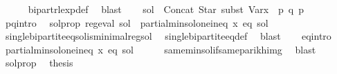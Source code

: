 \begin{isabellebody}
\ \ \ \ \isamarkupfalse%
\ bipart{\isacharunderscore}{\kern0pt}rlexp{\isacharunderscore}{\kern0pt}def\ \isamarkupfalse%
\ blast\isanewline
\isanewline
\ \ \isamarkupfalse%
\ {\isacharquery}{\kern0pt}sol\ {\isacharequal}{\kern0pt}\ {\isachardoublequoteopen}Concat\ {\isacharparenleft}{\kern0pt}Star\ {\isacharparenleft}{\kern0pt}subst\ {\isacharparenleft}{\kern0pt}Var{\isacharparenleft}{\kern0pt}x\ {\isacharcolon}{\kern0pt}{\isacharequal}{\kern0pt}\ p{\isacharparenright}{\kern0pt}{\isacharparenright}{\kern0pt}\ q{\isacharparenright}{\kern0pt}{\isacharparenright}{\kern0pt}\ p{\isachardoublequoteclose}\isanewline
\ \ \isamarkupfalse%
\ p{\isacharunderscore}{\kern0pt}q{\isacharunderscore}{\kern0pt}intro\ \isamarkupfalse%
\ sol{\isacharunderscore}{\kern0pt}prop{\isacharcolon}{\kern0pt}\ {\isachardoublequoteopen}reg{\isacharunderscore}{\kern0pt}eval\ {\isacharquery}{\kern0pt}sol\ {\isasymand}\ partial{\isacharunderscore}{\kern0pt}min{\isacharunderscore}{\kern0pt}sol{\isacharunderscore}{\kern0pt}one{\isacharunderscore}{\kern0pt}ineq\ x\ eq{\isacharprime}{\kern0pt}\ {\isacharquery}{\kern0pt}sol{\isachardoublequoteclose}\isanewline
\ \ \ \ \isamarkupfalse%
\ single{\isacharunderscore}{\kern0pt}bipartite{\isacharunderscore}{\kern0pt}eq{\isachardot}{\kern0pt}sol{\isacharunderscore}{\kern0pt}is{\isacharunderscore}{\kern0pt}minimal{\isacharunderscore}{\kern0pt}reg{\isacharunderscore}{\kern0pt}sol\ \isamarkupfalse%
\ single{\isacharunderscore}{\kern0pt}bipartite{\isacharunderscore}{\kern0pt}eq{\isacharunderscore}{\kern0pt}def\ \isamarkupfalse%
\ blast\isanewline
\ \ \isamarkupfalse%
\ eq{\isacharprime}{\kern0pt}{\isacharunderscore}{\kern0pt}intro\ \isamarkupfalse%
\ {\isachardoublequoteopen}partial{\isacharunderscore}{\kern0pt}min{\isacharunderscore}{\kern0pt}sol{\isacharunderscore}{\kern0pt}one{\isacharunderscore}{\kern0pt}ineq\ x\ eq\ {\isacharquery}{\kern0pt}sol{\isachardoublequoteclose}\isanewline
\ \ \ \ \isamarkupfalse%
\ same{\isacharunderscore}{\kern0pt}min{\isacharunderscore}{\kern0pt}sol{\isacharunderscore}{\kern0pt}if{\isacharunderscore}{\kern0pt}same{\isacharunderscore}{\kern0pt}parikh{\isacharunderscore}{\kern0pt}img\ \isamarkupfalse%
\ blast\isanewline
\ \ \isamarkupfalse%
\ sol{\isacharunderscore}{\kern0pt}prop\ \isamarkupfalse%
\ {\isacharquery}{\kern0pt}thesis\ \isamarkupfalse%

\end{isabellebody}
